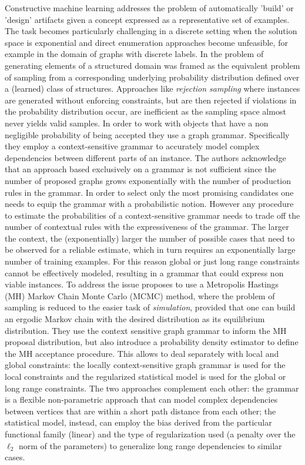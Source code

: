 \documentclass{article}
\begin{document}
Constructive machine learning addresses the problem of automatically 'build'
or 'design' artifacts given a concept expressed as a representative set of
examples. The task becomes particularly challenging in a discrete setting when
the solution space is exponential and direct enumeration approaches become
unfeasible, for example in the domain of graphs with discrete labels. In
\cite{costa16} the problem of generating elements of a structured domain was
framed as the equivalent problem of sampling from a corresponding underlying
probability distribution defined over a (learned) class of structures.
Approaches like {\em rejection sampling} where instances are generated without
enforcing constraints, but are then rejected if violations in the probability
distribution occur, are inefficient as the sampling space almost never yields
valid samples. In order to work with objects that have a non negligible
probability of being accepted they use a graph grammar. Specifically they
employ a context-sensitive grammar to accurately model complex dependencies
between different parts of an instance. The authors acknowledge that an
approach based exclusively on a grammar is not sufficient since the number of
proposed graphs grows exponentially with the number of production rules in the
grammar. In order to select only the most promising candidates one needs to
equip the grammar with a probabilistic notion. However any procedure to
estimate the probabilities of a context-sensitive grammar needs to trade off
the number of contextual rules with the expressiveness of the grammar. The
larger the context, the (exponentially) larger the number of possible cases
that need to be observed for a reliable estimate, which in turn requires an
exponentially large number of training examples. For this reason global or
just long range constraints cannot be effectively modeled, resulting in a
grammar that could express non viable instances. To address the issue
\cite{costa16} proposes to use a Metropolis Hastings (MH) Markov Chain Monte
Carlo (MCMC) method, where the problem of sampling is reduced to the easier
task of {\em simulation}, provided that one can build an ergodic Markov chain
with the desired distribution as its equilibrium distribution. They use the
context sensitive graph grammar to inform the MH proposal distribution, but
also introduce a probability density estimator to define the MH acceptance
procedure. This allows to deal separately with local and global constraints:
the locally context-sensitive graph grammar is used for the local constraints
and the regularized statistical model is used for the global or long range
constraints. The two approaches complement each other: the grammar is a
flexible non-parametric approach that can model complex dependencies between
vertices that are within a short path distance from each other; the
statistical model, instead, can employ the bias derived from the particular
functional family (linear) and the type of regularization used (a penalty over
the $\ell_2$ norm of the parameters) to generalize long range dependencies to
similar cases.
\end{document}
